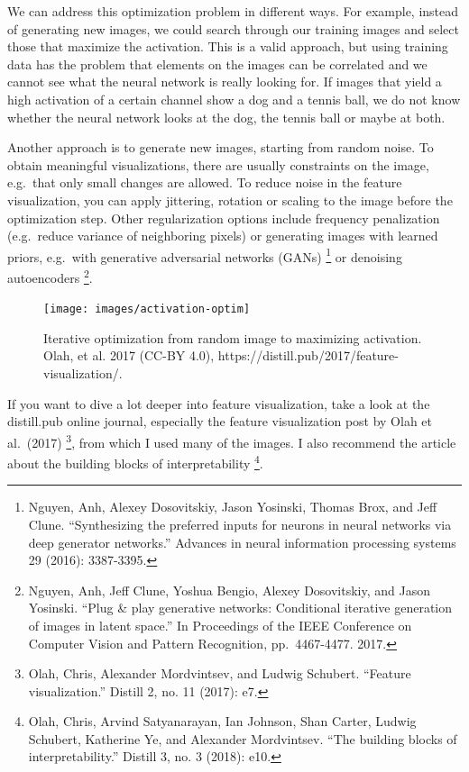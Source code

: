 \documentclass[
  10pt,
]{scrbook}
\begin{document}
We can address this optimization problem in different ways.
For example, instead of generating new images, we could search through our training images and select those that maximize the activation.
This is a valid approach, but using training data has the problem that elements on the images can be correlated and we cannot see what the neural network is really looking for.
If images that yield a high activation of a certain channel show a dog and a tennis ball, we do not know whether the neural network looks at the dog, the tennis ball or maybe at both.

Another approach is to generate new images, starting from random noise.
To obtain meaningful visualizations, there are usually constraints on the image, e.g.~that only small changes are allowed.
To reduce noise in the feature visualization, you can apply jittering, rotation or scaling to the image before the optimization step.
Other regularization options include frequency penalization (e.g.~reduce variance of neighboring pixels) or generating images with learned priors, e.g.~with generative adversarial networks (GANs) \footnote{Nguyen, Anh, Alexey Dosovitskiy, Jason Yosinski, Thomas Brox, and Jeff Clune. ``Synthesizing the preferred inputs for neurons in neural networks via deep generator networks.'' Advances in neural information processing systems 29 (2016): 3387-3395.} or denoising autoencoders \footnote{Nguyen, Anh, Jeff Clune, Yoshua Bengio, Alexey Dosovitskiy, and Jason Yosinski. ``Plug \& play generative networks: Conditional iterative generation of images in latent space.'' In Proceedings of the IEEE Conference on Computer Vision and Pattern Recognition, pp.~4467-4477. 2017.}.

\begin{figure}

{\centering \texttt{[image: images/activation-optim]} 

}

\caption{Iterative optimization from random image to maximizing activation. Olah, et al. 2017 (CC-BY 4.0), https://distill.pub/2017/feature-visualization/.}\label{fig:activation-optim}
\end{figure}

If you want to dive a lot deeper into feature visualization, take a look at the distill.pub online journal, especially the feature visualization post by Olah et al.~(2017) \footnote{Olah, Chris, Alexander Mordvintsev, and Ludwig Schubert. ``Feature visualization.'' Distill 2, no. 11 (2017): e7.}, from which I used many of the images.
I also recommend the article about the building blocks of interpretability \footnote{Olah, Chris, Arvind Satyanarayan, Ian Johnson, Shan Carter, Ludwig Schubert, Katherine Ye, and Alexander Mordvintsev. ``The building blocks of interpretability.'' Distill 3, no. 3 (2018): e10.}.
\end{document}
